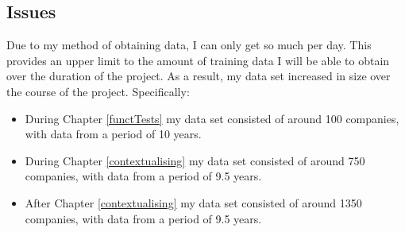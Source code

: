 \subsection{Issues} \label{dataIssues}
Due to my method of obtaining data, I can only get so much per day. This provides an upper limit to the amount of training data I will be able to obtain over the duration of the project. As a result, my data set increased in size over the course of the project. Specifically:
\begin{itemize}
    \item During Chapter \ref{functTests} my data set consisted of around 100 companies, with data from a period of 10 years.
    \item During Chapter \ref{contextualising} my data set consisted of around 750 companies, with data from a period of 9.5 years.
    \item After Chapter \ref{contextualising} my data set consisted of around 1350 companies, with data from a period of 9.5 years.
\end{itemize}